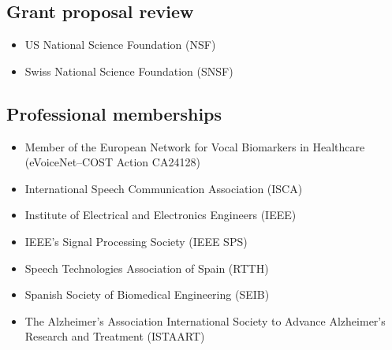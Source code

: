 \subsection{Grant proposal review}
\begin{itemize}
  \item US National Science Foundation (NSF)
  \item Swiss National Science Foundation (SNSF)
\end{itemize}

\subsection{Professional memberships}
\begin{itemize}

 \item Member of the European Network for Vocal Biomarkers in Healthcare (eVoiceNet--COST Action CA24128)
  \item International Speech Communication Association (ISCA)
  \item Institute of Electrical and Electronics Engineers (IEEE)
  \item IEEE’s Signal Processing Society (IEEE SPS)
  \item Speech Technologies Association of Spain (RTTH)
  \item Spanish Society of Biomedical Engineering (SEIB)
  \item The Alzheimer's Association International Society to Advance Alzheimer's Research and Treatment (ISTAART)
\end{itemize}
